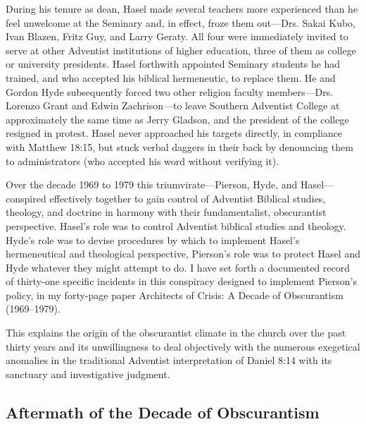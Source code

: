 During his tenure as dean, Hasel made several teachers more experienced than
he feel unwelcome at the Seminary and, in effect, froze them out---Drs.
Sakai Kubo, Ivan Blazen, Fritz Guy, and Larry Geraty. All four were
immediately invited to serve at other Adventist institutions of higher
education, three of them as college or university presidents. Hasel
forthwith appointed Seminary students he had trained, and who accepted his
biblical hermeneutic, to replace them. He and Gordon Hyde subsequently
forced two other religion faculty members---Drs. Lorenzo Grant and Edwin
Zachrison---to leave Southern Adventist College at approximately the same
time as Jerry Gladson, and the president of the college resigned in protest.
Hasel never approached his targets directly, in compliance with Matthew
18:15, but stuck verbal daggers in their back by denouncing them to
administrators (who accepted his word without verifying it).

Over the decade 1969 to 1979 this triumvirate---Pierson, Hyde, and
Hasel---conspired effectively together to gain control of Adventist Biblical
studies, theology, and doctrine in harmony with their fundamentalist,
obscurantist perspective. Hasel's 
role was to control Adventist biblical
studies and theology. Hyde's role was to devise procedures by which to
implement Hasel's hermeneutical and theological perspective, Pierson's role
was to protect Hasel and Hyde whatever they might attempt to do. I have set
forth a documented record of thirty-one specific incidents in this
conspiracy designed to implement Pierson's policy, in my forty-page paper
Architects of Crisis: A Decade of Obscurantism (1969--1979).

This explains the origin of the obscurantist climate in the church over the
past thirty years and its unwillingness to deal objectively with the
numerous exegetical anomalies in the traditional Adventist interpretation of
Daniel 8:14 with its sanctuary and investigative judgment.

\subsection{Aftermath of the Decade of Obscurantism}

